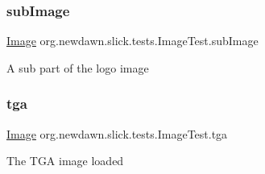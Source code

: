 \subsubsection{\texorpdfstring{sub\+Image}{subImage}}
{\footnotesize\ttfamily \mbox{\hyperlink{classorg_1_1newdawn_1_1slick_1_1_image}{Image}} org.\+newdawn.\+slick.\+tests.\+Image\+Test.\+sub\+Image\hspace{0.3cm}{\ttfamily [private]}}

A sub part of the logo image \mbox{\label{classorg_1_1newdawn_1_1slick_1_1tests_1_1_image_test_a7ab57bed77d7042ab2204139e041b466}} 
\subsubsection{\texorpdfstring{tga}{tga}}
{\footnotesize\ttfamily \mbox{\hyperlink{classorg_1_1newdawn_1_1slick_1_1_image}{Image}} org.\+newdawn.\+slick.\+tests.\+Image\+Test.\+tga\hspace{0.3cm}{\ttfamily [private]}}

The T\+GA image loaded 